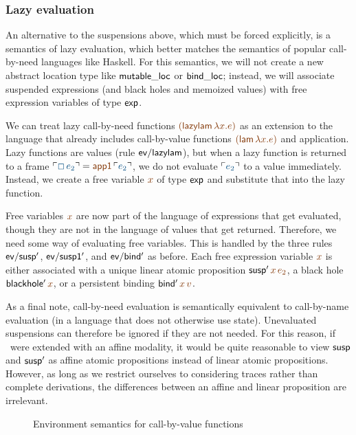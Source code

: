 \subsubsection{Lazy evaluation}

An alternative to the suspensions above, which must be forced
explicitly, is a semantics of lazy evaluation, which better matches
the semantics of popular call-by-need languages like Haskell. For this
semantics, we will not create a new abstract location type like ${\sf
  mutable\_loc}$ or ${\sf bind\_loc}$; instead, we will associate 
suspended expressions (and black holes and memoized values) with
free expression variables of type ${\sf exp}$.

We can treat lazy call-by-need functions $\lf{({\sf lazylam}\,\lambda
x.e)}$ as an extension to the language that already includes
call-by-value functions $\lf{({\sf lam}\,\lambda x.e)}$ and
application. Lazy functions are values (rule ${\sf ev/lazylam}$), but
when a lazy function is returned to a frame $\interp{\Box\,e_2} = \lf{{\sf
  app1}\,\interp{e_2}}$, we do not evaluate $\interp{e_2}$ to a value
immediately. Instead, we create a free variable $\lf{x}$ of type ${\sf
  exp}$ and substitute that into the lazy function.

Free variables $\lf{x}$ are now part of the language of expressions that
get evaluated, though they are not in the language of values that get
returned. Therefore, we need some way of evaluating free
variables. This is handled by the three rules ${\sf ev/susp'}$, ${\sf
  ev/susp1'}$, and ${\sf ev/bind'}$ as before. Each free expression
variable $\lf{x}$ is either associated with a unique linear atomic
proposition ${\sf susp'}\,\lf{x}\,\lf{e_2}$, a black hole 
${\sf blackhole'}\,\lf{x}$,
or a persistent binding ${\sf bind'}\,\lf{x}\,\lf{v}$.

As a final note, call-by-need evaluation is semantically equivalent to
call-by-name evaluation (in a language that does not otherwise use
state). Unevaluated suspensions can therefore be ignored if they are
not needed. For this reason, if \sls~were extended with an affine
modality, it would be quite reasonable to view ${\sf susp}$ and ${\sf
  susp'}$ as affine atomic propositions instead of linear atomic
propositions. However, as long as we
restrict ourselves to considering traces rather than complete
derivations, the differences between an affine and linear proposition
are irrelevant.

\begin{figure}
\caption{Environment semantics for call-by-value functions}
\label{fig:ssos-by-env}
\end{figure}

